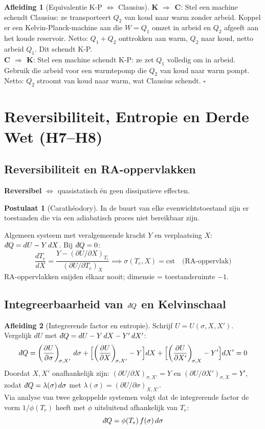 \documentclass[a4paper,twoside,10pt]{article}
\theoremstyle{definition}
\newtheorem{postulate}{Postulaat}[section]
\newtheorem{derivation}{Afleiding}[section]
\newcommand{\dbar}{{\mkern+3mu\mathchar'26\mkern-12mu d}}
\newcommand{\pd}[3][]{\left(\dfrac{\partial #2}{\partial #3}\right)_{\!#1}}
\begin{document}
\begin{derivation}[Equivalentie K-P $\Leftrightarrow$ Clausius]
\textbf{K $\Rightarrow$ C}: Stel een machine schendt Clausius: ze transporteert $Q_2$ van koud naar warm
zonder arbeid. Koppel er een Kelvin-Planck-machine aan die $W = Q_1$ omzet in arbeid en $Q_2$
afgeeft aan het koude reservoir. Netto: $Q_1 + Q_2$ onttrokken aan warm, $Q_2$ naar koud, netto arbeid $Q_1$. Dit schendt K-P. \\[2pt]
\textbf{C $\Rightarrow$ K}: Stel een machine schendt K-P: ze zet $Q_1$ volledig om in arbeid. Gebruik die arbeid voor een warmtepomp die $Q_2$ van koud naar warm pompt.
Netto: $Q_2$ stroomt van koud naar warm, wat Clausius schendt. \hfill$\square$
\end{derivation}

\section{Reversibiliteit, Entropie en Derde Wet (H7--H8)}

\subsection{Reversibiliteit en RA-oppervlakken}

\textbf{Reversibel} $\Leftrightarrow$ quasistatisch én geen dissipatieve effecten.

\begin{postulate}[Carathéodory]
In de buurt van elke evenwichtstoestand zijn er toestanden die via een adiabatisch
proces niet bereikbaar zijn.
\end{postulate}

Algemeen systeem met veralgemeende kracht $Y$ en verplaatsing $X$:
$\dbar Q = dU - Y\,dX$. Bij $\dbar Q=0$:
\[
  \frac{dT_e}{dX} = \frac{Y - (\partial U/\partial X)_{T_e}}{(\partial U/\partial T_e)_X}
  \implies \sigma(T_e, X) = \mathrm{cst}
  \quad\text{(RA-oppervlak)}
\]
RA-oppervlakken snijden elkaar nooit; dimensie = toestandsruimte $-1$.

\subsection{Integreerbaarheid van $\dbar Q$ en Kelvinschaal}

\begin{derivation}[Integrerende factor en entropie]
Schrijf $U = U(\sigma, X, X')$. Vergelijk $dU$ met $\dbar Q = dU - Y\,dX - Y'\,dX'$:
\[
  \dbar Q = \pd[\sigma,X']{U}{\sigma}\,d\sigma
  + \Bigl[\pd[\sigma,X']{U}{X}-Y\Bigr]dX
  + \Bigl[\pd[\sigma,X]{U}{X'}-Y'\Bigr]dX' = 0
\]
Doordat $X, X'$ onafhankelijk zijn: $(\partial U/\partial X)_{\sigma,X'}=Y$ en
$(\partial U/\partial X')_{\sigma,X}=Y'$, zodat $\dbar Q = \lambda(\sigma)\,d\sigma$
met $\lambda(\sigma) = (\partial U/\partial\sigma)_{X,X'}$.\\[4pt]
Via analyse van twee gekoppelde systemen volgt dat de integrerende factor de vorm
$1/\phi(T_e)$ heeft met $\phi$ uitsluitend afhankelijk van $T_e$:
\[
  \dbar Q = \phi(T_e)\,f(\sigma)\,d\sigma
\]
\end{derivation}
\end{document}
